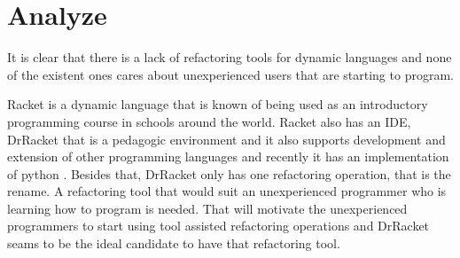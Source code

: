 \section{Analyze}

It is clear that there is a lack of refactoring tools for dynamic languages and none of the existent ones cares about unexperienced users that are starting to program.

Racket is a dynamic language that is known of being used as an introductory programming course in schools around the world. Racket also has an IDE, DrRacket that is a pedagogic environment \cite{drscheme_pegadogy} and it also supports development and extension of other programming languages \cite{tobin2011languages} and recently it has an implementation of python \cite{ramos2014implementation}.
Besides that, DrRacket only has one refactoring operation, that is the rename.
A refactoring tool that would suit an unexperienced programmer who is learning how to program is needed. That will motivate the unexperienced programmers to start using tool assisted refactoring operations and DrRacket seams to be the ideal candidate to have that refactoring tool.


